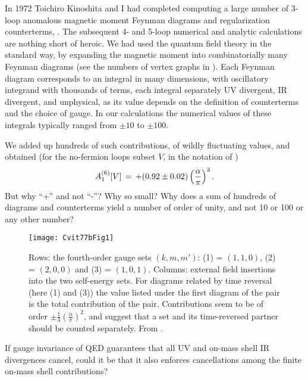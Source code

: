 In 1972 Toichiro Kinoshita and I had completed computing a large number
of 3-loop anomalous magnetic moment Feynman diagrams and regularization
counterterms, .
The subsequent 4- and 5-loop numerical and analytic calculations
are nothing short of heroic.
We had used the quantum field theory in the standard way, by expanding
the magnetic moment into combinatorially many Feynman diagrams (see the
numbers of vertex graphs in ).
Each Feynman diagram corresponds to an integral in many dimensions, with
oscillatory integrand with thousands of terms, each integral separately
UV divergent, IR divergent, and unphysical, as its value depends on the
definition of counterterms and the choice of gauge. In our calculations
the numerical values of these integrals typically ranged from  $\pm 10$
to $\pm 100$.

We added up hundreds of such contributions, of wildly fluctuating values,
and obtained (for the no-fermion loops subset $V$, in the notation of
)
\[
 A_1^{(6)}[V]\,=\, +  (0.92 \pm 0.02) \left(\frac{\alpha}{\pi}\right)^3.
\]
But why ``+'' and not ``-''? Why so small? Why does a sum of hundreds of
diagrams and counterterms yield a number of order of unity, and not 10 or
100 or any other number?

\begin{figure}
\begin{center}
\texttt{[image: Cvit77bFig1]}
\end{center}
\caption{\label{Cvit77bFig1}
Rows: the fourth-order gauge sets
$(k,m,m')$: (1) = $(1,1,0)$,
(2) = $(2,0,0)$
and
(3) = $(1,0,1)$.
Columns: external field insertions into the two self-energy sets.
For diagrams related by time
reversal (here (1) and (3))
the value listed under the first diagram of the pair is
the total contribution of the pair. Contributions seem to be of order
$\pm\frac{1}{3}\left(\frac{\alpha}{\pi}\right)^2$, and suggest that
a set and its time-reversed partner should be counted separately.
From .
}
 \end{figure}

If gauge invariance of QED guarantees that all UV and on-mass shell IR
divergences cancel, could it be that it also enforces cancellations among
the finite on-mass shell contributions?

